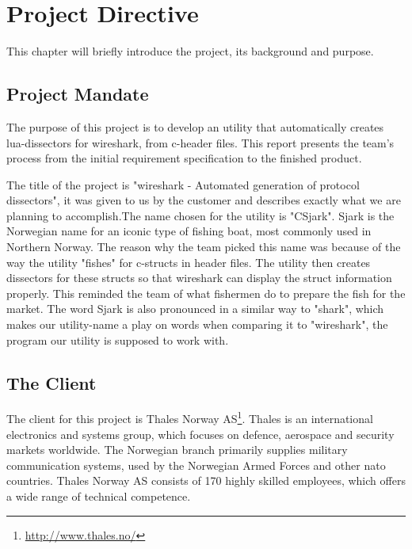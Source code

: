 \chapter{Project Directive}
This chapter will briefly introduce the project, its background and purpose.


\section{Project Mandate}
The purpose of this project is to develop an \gls{utility} that automatically creates \Gls{lua}-\glspl{dissector} for \Gls{wireshark}, from \Gls{c}-\gls{header} files. This report presents the team’s process from the initial requirement specification to the finished product. 

The title of the project is "\Gls{wireshark} - Automated generation of \gls{protocol} \glspl{dissector}", it was given to us by the customer and describes exactly what we are planning to accomplish.The name chosen for the \gls{utility} is "CSjark". Sjark is the Norwegian name for an iconic type of fishing boat, most commonly used in Northern Norway. The reason why the team picked this name was because of the way the \gls{utility} "fishes" for \Gls{c}-\glspl{struct} in \gls{header} files. The \gls{utility} then creates \glspl{dissector} for these \glspl{struct} so that \Gls{wireshark} can display the \gls{struct} information properly. This reminded the team of what fishermen do to prepare the fish for the market. The word Sjark is also pronounced in a similar way to "shark", which makes our \gls{utility}-name a play on words when comparing it to "\Gls{wireshark}", the program our \gls{utility} is supposed to work with.


\section{The Client}
The client for this project is
Thales Norway AS\footnote{\url{http://www.thales.no/}}. Thales is an
international electronics and systems group, which focuses on defence,
aerospace and security markets worldwide. The Norwegian branch primarily
supplies military communication systems, used by the Norwegian Armed Forces
and other \Gls{nato} countries. Thales Norway AS consists of 170 highly skilled
employees, which offers a wide range of technical competence.


